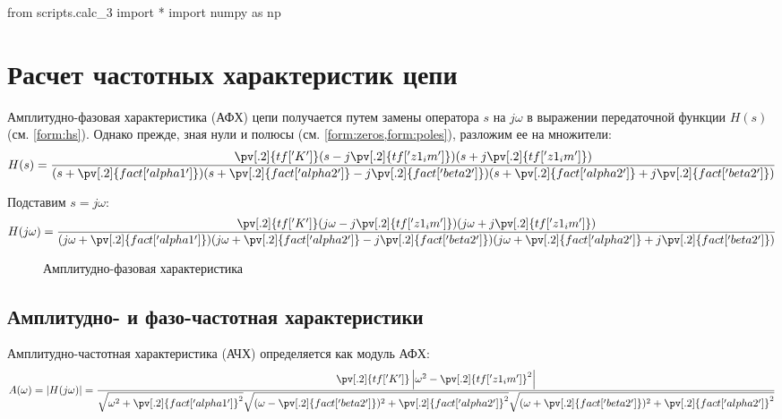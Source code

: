 \begin{python}
from scripts.calc_3 import *
import numpy as np
\end{python}

\section{Расчет частотных характеристик цепи}

Амплитудно-фазовая характеристика (АФХ) цепи получается путем замены оператора $s$ на $j\omega$ в выражении передаточной функции $H(s)$ (см. \cref{form:hs}). Однако прежде, зная нули и полюсы (см. \cref{form:zeros,form:poles}), разложим ее на множители:
\begin{equation}
    H(s) = \frac{\pv[.2]{tf['K']}(s - j\pv[.2]{tf['z1_im']})(s + j\pv[.2]{tf['z1_im']})}{(s + \pv[.2]{fact['alpha1']})(s + \pv[.2]{fact['alpha2']} - j\pv[.2]{fact['beta2']})(s + \pv[.2]{fact['alpha2']} + j\pv[.2]{fact['beta2']})}
    \label{form:hs_simply}
\end{equation}

Подставим $s = j\omega$:
\begin{equation}
    H(j\omega) = \frac{
        \pv[.2]{tf['K']}
        (j\omega - j\pv[.2]{tf['z1_im']})
        (j\omega + j\pv[.2]{tf['z1_im']})
    }{
        (j\omega + \pv[.2]{fact['alpha1']})
        (j\omega + \pv[.2]{fact['alpha2']} - j\pv[.2]{fact['beta2']})
        (j\omega + \pv[.2]{fact['alpha2']} + j\pv[.2]{fact['beta2']})
    }
\end{equation}

\begin{figure}[H]
    \centering
    
    \caption{Амплитудно-фазовая характеристика}
    \label{fig:afh}
\end{figure}

\subsection{Амплитудно- и фазо-частотная характеристики}

Амплитудно-частотная характеристика (АЧХ) определяется как модуль АФХ:
\begin{equation}
    A(\omega) = |H(j\omega)| = 
    \frac{
        \pv[.2]{tf['K']}
        \left|\omega^2 - \pv[.2]{tf['z1_im']}^2\right|
    }{
        \sqrt{\omega^2 + \pv[.2]{fact['alpha1']}^2}
        \sqrt{(\omega - \pv[.2]{fact['beta2']})^2 + \pv[.2]{fact['alpha2']}^2}
        \sqrt{(\omega + \pv[.2]{fact['beta2']})^2 + \pv[.2]{fact['alpha2']}^2}
    }
    \label{form:AChH}
\end{equation}

